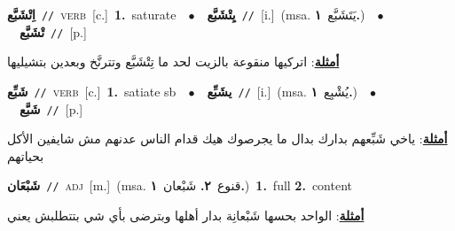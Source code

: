 \documentclass[10pt,a4paper,twoside]{article} %
\begin{document}
\begin{multicols}{2}
{{{{{{{{{{{\setlength\topsep{0pt}\textbf{\foreignlanguage{arabic}{اِتْشَبَّع}}\ {\color{gray}\texttt{//}\color{black}}\ \textsc{verb}\ [c.]\ \textbf{1.}~saturate\ \ $\bullet$\ \ \setlength\topsep{0pt}\textbf{\foreignlanguage{arabic}{يِتْشَبَّع}}\ {\color{gray}\texttt{//}\color{black}}\ [i.]\ \color{gray}(msa. \foreignlanguage{arabic}{يَتَشَبَّع}~\foreignlanguage{arabic}{\textbf{١.}})\color{black}\ \ $\bullet$\ \ \setlength\topsep{0pt}\textbf{\foreignlanguage{arabic}{تْشَبَّع}}\ {\color{gray}\texttt{//}\color{black}}\ [p.]\  \begin{flushright}\color{gray}\foreignlanguage{arabic}{\textbf{\underline{\foreignlanguage{arabic}{أمثلة}}}: اتركيها منقوعة بالزيت لحد ما تِتْشَبَّع وتترنَّخ وبعدين بتشيليها}\end{flushright}\color{black}} \vspace{2mm}

{\setlength\topsep{0pt}\textbf{\foreignlanguage{arabic}{شَبِّع}}\ {\color{gray}\texttt{//}\color{black}}\ \textsc{verb}\ [c.]\ \textbf{1.}~satiate sb\ \ $\bullet$\ \ \setlength\topsep{0pt}\textbf{\foreignlanguage{arabic}{يشَبِّع}}\ {\color{gray}\texttt{//}\color{black}}\ [i.]\ \color{gray}(msa. \foreignlanguage{arabic}{يُشْبِع}~\foreignlanguage{arabic}{\textbf{١.}})\color{black}\ \ $\bullet$\ \ \setlength\topsep{0pt}\textbf{\foreignlanguage{arabic}{شَبَّع}}\ {\color{gray}\texttt{//}\color{black}}\ [p.]\  \begin{flushright}\color{gray}\foreignlanguage{arabic}{\textbf{\underline{\foreignlanguage{arabic}{أمثلة}}}: ياخي شَبِّعهم بدارك بدال ما يجرصوك هيك قدام الناس عدنهم مش شايفين الأكل بحياتهم}\end{flushright}\color{black}} \vspace{2mm}

{\setlength\topsep{0pt}\textbf{\foreignlanguage{arabic}{شَبْعَان}}\ {\color{gray}\texttt{//}\color{black}}\ \textsc{adj}\ [m.]\ \color{gray}(msa. \foreignlanguage{arabic}{قنوع}~\foreignlanguage{arabic}{\textbf{٢.}}  \foreignlanguage{arabic}{شَبْعان}~\foreignlanguage{arabic}{\textbf{١.}})\color{black}\ \textbf{1.}~full  \textbf{2.}~content\  \begin{flushright}\color{gray}\foreignlanguage{arabic}{\textbf{\underline{\foreignlanguage{arabic}{أمثلة}}}: الواحد بحسها شَبْعانِة بدار أهلها وبترضى بأي شي بتتطلبش يعني}\end{flushright}\color{black}} \vspace{2mm}

}}}}}}}}}}
\end{multicols}
\end{document}
